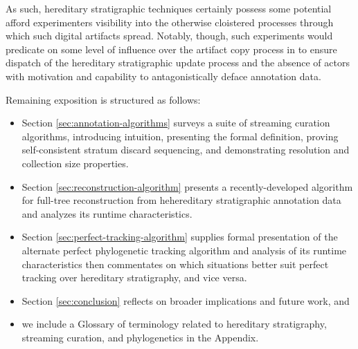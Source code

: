 As such, hereditary stratigraphic techniques certainly possess some potential afford experimenters visibility into the otherwise cloistered processes through which such digital artifacts spread.
Notably, though, such experiments would predicate on some level of influence over the artifact copy process in to ensure dispatch of the hereditary stratigraphic update process and the absence of actors with motivation and capability to antagonistically deface annotation data.

Remaining exposition is structured as follows:
\begin{itemize}
\item Section \ref{sec:annotation-algorithms} surveys a suite of streaming curation algorithms, introducing intuition, presenting the formal definition, proving self-consistent stratum discard sequencing, and demonstrating resolution and collection size properties.
\item Section \ref{sec:reconstruction-algorithm} presents a recently-developed algorithm for full-tree reconstruction from hehereditary stratigraphic annotation data and analyzes its runtime characteristics.
\item Section \ref{sec:perfect-tracking-algorithm} supplies formal presentation of the alternate perfect phylogenetic tracking algorithm and analysis of its runtime characteristics then commentates on which situations better suit perfect tracking over hereditary stratigraphy, and vice versa.
\item Section \ref{sec:conclusion} reflects on broader implications and future work, and
\item we include a Glossary of terminology related to hereditary stratigraphy, streaming curation, and phylogenetics in the Appendix.
\end{itemize}
